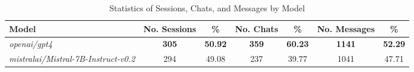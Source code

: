 
\begin{table}[H]
\centering
\scriptsize
\begin{tabular}{@{}lcccccc@{}}
\toprule
Model & No. Sessions & \% & No. Chats & \% & No. Messages & \% \\
\midrule
\textit{openai/gpt4} & \textbf{305} & \textbf{50.92} & \textbf{359} & \textbf{60.23} & \textbf{1141} & \textbf{52.29} \\
\textit{mistralai/Mistral-7B-Instruct-v0.2} & 294 & 49.08 & 237 & 39.77 & 1041 & 47.71 \\

\bottomrule
\end{tabular}
\caption{Statistics of Sessions, Chats, and Messages by Model}
\label{tab:sessions_chats_and_messages_by_model}
\end{table}
